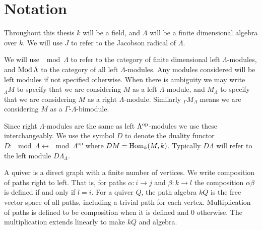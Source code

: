 \section*{Notation}
%

Throughout this thesis $k$ will be a field, and $\Lambda$ will be a finite dimensional algebra over $k$. We will use $J$ to refer to the Jacobson radical of $\Lambda$.


We will use $\mod\Lambda$ to refer to the category of finite dimensional left $\Lambda$-modules, and $\operatorname{Mod}\Lambda$ to the category of all left $\Lambda$-modules. Any modules considered will be left modules if not specified otherwise. When there is ambiguity we may write $_\Lambda M$ to specify that we are considering $M$ as a left $\Lambda$-module, and $M_\Lambda$ to specify that we are considering $M$ as a right $\Lambda$-module. Similarly $_\Gamma M_\Lambda$ means we are considering $M$ as a $\Gamma$-$\Lambda$-bimodule.


Since right $\Lambda$-modules are the same as left $\Lambda^{\operatorname{op}}$-modules we use these interchangeably. We use the symbol $D$ to denote the duality functor $D\colon \mod \Lambda \leftrightarrow \mod\Lambda^{\operatorname{op}}$ where $DM = \operatorname{Hom}_k(M, k)$. Typically $D\Lambda$ will refer to the left module $D\Lambda_\Lambda$.


A quiver is a direct graph with a finite number of vertices. We write composition of paths right to left. That is, for paths $\alpha\colon i \to j$ and $\beta\colon k\to l$ the composition $\alpha\beta$ is defined if and only if $l=i$. For a quiver $Q$, the path algebra $kQ$ is the free vector space of all paths, including a trivial path for each vertex. Multiplication of paths is defined to be composition when it is defined and 0 otherwise. The multiplication extends linearly to make $kQ$ and algebra.


